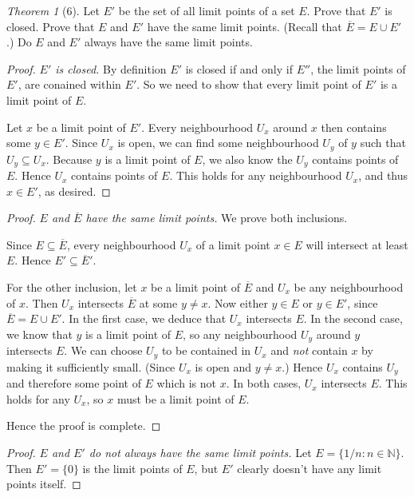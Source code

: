 \documentclass[12pt]{article}
\theoremstyle{remark}
\theoremstyle{named}
\newtheorem*{theorem}{Theorem}
\begin{document}
\begin{theorem}[6]
    Let $E'$ be the set of all limit points of a set $E$. Prove that $E'$ is closed. Prove that $E$ and $E'$ have the same limit points. (Recall that $\overline E = E \cup E'$.) Do $E$ and $E'$ always have the same limit points.
\end{theorem}

\begin{proof}
    \textit{$E'$ is closed.} By definition $E'$ is closed if and only if $E''$, the limit points of $E'$, are conained within $E'$. So we need to show that every limit point of $E'$ is a limit point of $E$.

    Let $x$ be a limit point of $E'$. Every neighbourhood $U_x$ around $x$ then contains some $y \in E'$. Since $U_x$ is open, we can find some neighbourhood $U_y$ of $y$ such that $U_y \subseteq U_x$. Because $y$ is a limit point of $E$, we also know the $U_y$ contains points of $E$. Hence $U_x$ contains points of $E$. This holds for any neighbourhood $U_x$, and thus $x \in E'$, as desired.  
\end{proof}

\begin{proof}
    \textit{$E$ and $\overline{E}$ have the same limit points.} We prove both inclusions.

    Since $E \subseteq \overline{E}$, every neighbourhood $U_x$ of a limit point $x \in E$ will intersect at least $E$. Hence $E' \subseteq \overline{E}'$.

    For the other inclusion, let $x$ be a limit point of $\overline{E}$ and $U_x$ be any neighbourhood of $x$. Then $U_x$ intersects $\overline{E}$ at some $y \neq x$. Now either $y \in E$ or $y \in E'$, since $\overline{E} = E \cup E'$. In the first case, we deduce that $U_x$ intersects $E$. In the second case, we know that $y$ is a limit point of $E$, so any neighbourhood $U_y$ around $y$ intersects $E$. 
    We can choose $U_y$ to be contained in $U_x$ and \textit{not} contain $x$ by making it sufficiently small. (Since $U_x$ is open and $y \neq x$.) Hence $U_x$ contains $U_y$ and therefore some point of $E$ which is not $x$. In both cases, $U_x$ intersects $E$. This holds for any $U_x$, so $x$ must be a limit point of $E$. 

    Hence the proof is complete.
\end{proof}

\begin{proof}
    \textit{$E$ and $E'$ do not always have the same limit points.} Let $E = \{1/n : n \in \mathbb N\}$. Then $E' = \{0\}$ is the limit points of $E$, but $E'$ clearly doesn't have any limit points itself. 
\end{proof}
\end{document}
